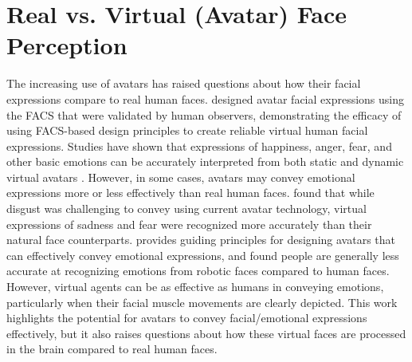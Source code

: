 \section{Real vs. Virtual (Avatar) Face Perception}
The increasing use of avatars has raised questions about how their facial expressions compare to real human faces.
\cite{garcia_design_2020} designed avatar facial expressions using the FACS that were validated by human observers, demonstrating the efficacy of using FACS-based design principles to create reliable virtual human facial expressions.
Studies have shown that expressions of happiness, anger, fear, and other basic emotions can be accurately interpreted from both static and dynamic virtual avatars \citep{de_paolis_perception_2015, dyck_recognition_2008}.
However, in some cases, avatars may convey emotional expressions more or less effectively than real human faces. 
\cite{dyck_recognition_2008} found that while disgust was challenging to convey using current avatar technology, virtual expressions of sadness and fear were recognized more accurately than their natural face counterparts.
\cite{hortensius_perception_2018} provides guiding principles for designing avatars that can effectively convey emotional expressions, and found people are generally less accurate at recognizing emotions from robotic faces compared to human faces. 
However, virtual agents can be as effective as humans in conveying emotions, particularly when their facial muscle movements are clearly depicted.
This work highlights the potential for avatars to convey facial/emotional expressions effectively, but it also raises questions about how these virtual faces are processed in the brain compared to real human faces.

